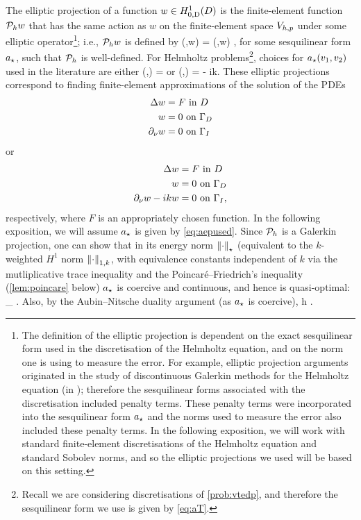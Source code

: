 The elliptic projection of a function $ w \in \HozDD$ is the finite-element function $\mathcal P_{h} w$ that has the same action as $w$ on the finite-element space $V_{h,p}$ under some elliptic operator\footnote{The definition of the elliptic projection is dependent on the exact sesquilinear form used in the discretisation of the Helmholtz equation, and on the norm one is using to measure the error. For example, elliptic projection arguments originated in the study of discontinuous Galerkin methods for the Helmholtz equation (in \cite{FeWu:09,FeWu:11}); therefore the sesquilinear forms associated with the discretisation included penalty terms. These penalty terms were incorporated into the sesquilinear form $a_{\star}$ and the norms used to measure the error also included these penalty terms. In the following exposition, we will work with standard finite-element discretisations of the Helmholtz equation and standard Sobolev norms, and so the elliptic projections we used will be based on this setting.}; i.e., $\mathcal P_{h} w$ is defined by
\beqs
\aep(\vh,\Ph w) = \aep(\vh,w) \tforall \vh \in \Vhp,
\eeqs
for some sesquilinear form $a_{\star}$, such that $\mathcal P_{h}$ is well-defined. For Helmholtz problems\footnote{Recall we are considering discretisations of \cref{prob:vtedp}, and therefore the sesquilinear form we use is given by \cref{eq:aT}.}, choices for $a_{\star}(v_{1},v_{2})$ used in the literature are either
\beqs
\aep(\vo,\vt) = \IPLtD{\grad \vo}{\grad \vt}
\eeqs
or
\beq\label{eq:aepused}
\aep(\vo,\vt) = \IPLtD{\grad \vo}{\grad \vt} - ik\IPLtGI{\vo}{\vt}.
\eeq
These elliptic projections correspond to finding finite-element approximations of the solution of the PDEs
\begin{align*}
  \Delta w &= F \text{ in } D\\
  w &= 0 \text{ on } \Gamma_{D}\\
  \partial_{\nu} w &= 0 \text{ on } \Gamma_{I}
\end{align*}
or
\begin{align*}
  \Delta w &= F \text{ in } D\\
  w &= 0 \text{ on } \Gamma_{D}\\
  \partial_{\nu} w -ikw &= 0 \text{ on } \Gamma_{I},
\end{align*}
respectively, where $F$ is an appropriately chosen function. In the following exposition, we will assume $a_{\star}$ is given by \cref{eq:aepused}.
Since $\mathcal P_{h}$ is a Galerkin projection, one can show that in its energy norm $\Nep{\cdot}$ (equivalent to the $k$-weighted $H^1$ norm $\NW{\cdot}$, with equivalence constants independent of $k$ via the mutliplicative trace inequality and the Poincar\'e--Friedrich's inequality (\cref{lem:poincare} below) $a_{\star}$ is coercive and continuous, and hence is quasi-optimal:
\beq\label{eq:epho}
 \lesssim \inf_{\vh \in \Vhp} .
\eeq
Also, by the Aubin--Nitsche duality argument (as $a_{\star}$ is coercive),
\beq\label{eq:eplt}
 \lesssim h .
\eeq
{}

